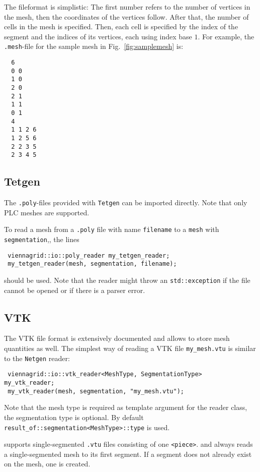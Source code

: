  The fileformat is simplistic: The first number refers to the number of vertices in the mesh, then the coordinates of the vertices follow. After that, the number of cells in the mesh is specified. Then, each cell is specified by the index of the segment and the indices of its vertices, each using index base $1$.
 For example, the \texttt{.mesh}-file for the sample mesh in Fig.~\ref{fig:samplemesh} is:
 \begin{verbatim}
  6
  0 0
  1 0
  2 0
  2 1
  1 1
  0 1
  4
  1 1 2 6
  1 2 5 6
  2 2 3 5
  2 3 4 5
 \end{verbatim}

 \subsection{Tetgen}
 The \texttt{.poly}-files provided with \texttt{Tetgen} \cite{tetgen} can be imported directly. Note that only PLC meshes are supported.

 To read a mesh from a \texttt{.poly} file with name \lstinline|filename| to a \lstinline|mesh| with \lstinline|segmentation|,, the lines
 \begin{lstlisting}
 viennagrid::io::poly_reader my_tetgen_reader;
 my_tetgen_reader(mesh, segmentation, filename);
 \end{lstlisting}
 should be used. Note that the reader might throw an \lstinline|std::exception| if the file cannot be opened or if there is a parser error.

 \subsection{VTK}
 The VTK file format is extensively documented \cite{VTKfileformat} and allows to store mesh quantities as well.
 The simplest way of reading a VTK file \lstinline|my_mesh.vtu| is similar to the \texttt{Netgen} reader:
 \begin{lstlisting}
 viennagrid::io::vtk_reader<MeshType, SegmentationType>  my_vtk_reader;
 my_vtk_reader(mesh, segmentation, "my_mesh.vtu");
 \end{lstlisting}
 Note that the mesh type is required as template argument for the reader class, the segmentation type is optional. By default \lstinline|result_of::segmentation<MeshType>::type| is used.

 {\ViennaGrid} supports single-segmented \lstinline|.vtu| files consisting of one \lstinline|<piece>|.
 and always reads a single-segmented mesh to its first segment. If a segment does not already exist on the mesh, one is created.

